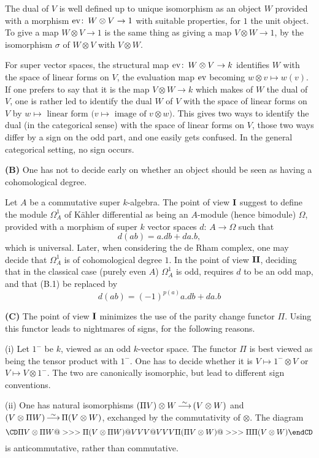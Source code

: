 The dual of $V$ is well defined up to unique isomorphism
as an object $W$ provided with a morphism $\text{\rm ev}\colon\,
W\otimes V\to 1$ with suitable properties, for $1$ the
unit object.
To give a map $W\otimes V\to 1$ is the same thing as
giving a map $V\otimes W\to 1$, by the isomorphism
$\sigma$ of $W\otimes V$ with $V\otimes W$.

For super vector spaces, the structural map
$\text{\rm ev}\colon\,W\otimes V\to k$ identifies $W$ with the space
of linear forms on $V$, the evaluation map $\text{\rm ev}$ becoming
$w\otimes v\mapsto w(v)$.
If one prefers to say that it is the map $V\otimes W\to
k$ which makes of $W$ the dual of $V$, one is rather led
to identify the dual $W$ of $V$ with the space of linear
forms on $V$ by $w\mapsto\text{ linear form }(v\mapsto
\text{ image of $v\otimes w$)}$.
This gives two ways to identify the dual (in the
categorical sense) with the space of linear forms on
$V$, those two ways differ by a sign on the odd part,
and one easily gets confused.
In the general categorical setting, no sign occurs.

\medskip\noindent
{\bf (B)}\enspace
One has not to decide early on whether an object should
be seen as having a cohomological degree.

Let $A$ be a commutative super $k$-algebra.
The point of view $\text{\bf I}$ suggest to define the module 
$\Omega_A^1$ of K\"ahler differential as being an
$A$-module (hence bimodule) $\Omega$, provided with a
morphism of super $k$ vector spaces
$d\colon\,A\to\Omega$ such that
$$
d(ab)=a.db+ da.b,\tag{B.1}
$$
which is universal.
Later, when considering the de Rham complex, one may
decide that $\Omega_A^1$ is of cohomological degree $1$.
In the point of view $\text{\bf II}$, deciding that in the
classical case (purely even $A$) $\Omega_A^1$ is odd,
requires $d$ to be an odd map, and that (B.1) be
replaced by
$$
d(ab)=(-1)^{p(a)}a.db+da.b\tag{B.2}
$$
\endexample

\medskip\noindent
{\bf (C)}\enspace
The point of view $\text{\bf I}$ minimizes the use of the parity
change functor $\Pi$.
Using this functor leads to nightmares of signs, for the
following reasons.

\medskip\noindent
(i)\enspace
Let $1^-$ be $k$, viewed as an odd $k$-vector space.
The functor $\Pi$ is best viewed as being the tensor
product with $1^-$.
One has to decide whether it is $V\mapsto 1^-\otimes V$
or $V\mapsto V\otimes 1^-$.
The two are canonically isomorphic, but lead to
different sign conventions.

\smallskip\noindent
(ii)\enspace
One has natural isomorphisms $(\Pi V)\otimes W\arrowsim
(V\otimes W)$ and $(V\otimes \Pi W)\arrowsim
\Pi(V\otimes W)$, exchanged by the commutativity of
$\otimes$.
The diagram
$$
\CD
\Pi V\otimes\Pi W @>>> \Pi(V\otimes\Pi W)\\
@VVV @VVV\\
\Pi(\Pi V\otimes W) @>>> \Pi\Pi(V\otimes W)
\endCD
$$
is anticommutative, rather than commutative.

